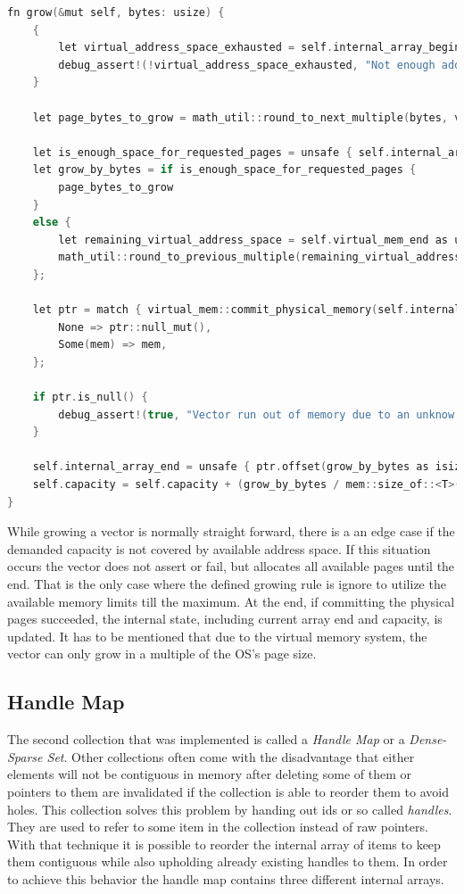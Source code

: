 \begin{lstlisting}[caption={Growth function of the Spark vector in Rust.}, label={lst:vector_growth}, language={C++}]
fn grow(&mut self, bytes: usize) {
	{
		let virtual_address_space_exhausted = self.internal_array_begin.as_ptr() as *mut u8 == self.virtual_mem_end;
		debug_assert!(!virtual_address_space_exhausted, "Not enough address space to grow further");
	}
	
	let page_bytes_to_grow = math_util::round_to_next_multiple(bytes, virtual_mem::get_page_size());
	
	let is_enough_space_for_requested_pages = unsafe { self.internal_array_end.offset(page_bytes_to_grow as isize) <= self.virtual_mem_end };
	let grow_by_bytes = if is_enough_space_for_requested_pages {
		page_bytes_to_grow
	}
	else {
		let remaining_virtual_address_space = self.virtual_mem_end as usize - self.internal_array_end as usize;
		math_util::round_to_previous_multiple(remaining_virtual_address_space, virtual_mem::get_page_size())
	};
	
	let ptr = match { virtual_mem::commit_physical_memory(self.internal_array_end, grow_by_bytes) } {
		None => ptr::null_mut(),
		Some(mem) => mem,
	};
	
	if ptr.is_null() {
		debug_assert!(true, "Vector run out of memory due to an unknow error");
	}
	
	self.internal_array_end = unsafe { ptr.offset(grow_by_bytes as isize) };
	self.capacity = self.capacity + (grow_by_bytes / mem::size_of::<T>());
}
\end{lstlisting}

\noindent
While growing a vector is normally straight forward, there is a an edge case if the demanded capacity is not covered by available address space. If this situation occurs the vector does not assert or fail, but allocates all available pages until the end. That is the only case where the defined growing rule is ignore to utilize the available memory limits till the maximum. At the end, if committing the physical pages succeeded, the internal state, including current array end and capacity, is updated. It has to be mentioned that due to the virtual memory system, the vector can only grow in a multiple of the \ac{OS}'s page size.

\subsection{Handle Map} \label{handle_map_impl}

The second collection that was implemented is called a \textit{Handle Map} or a \textit{Dense-Sparse Set}. Other collections often come with the disadvantage that either elements will not be contiguous in memory after deleting some of them or pointers to them are invalidated if the collection is able to reorder them to avoid holes. This collection solves this problem by handing out ids or so called \textit{handles}. They are used to refer to some item in the collection instead of raw pointers. With that technique it is possible to reorder the internal array of items to keep them contiguous while also upholding already existing handles to them. In order to achieve this behavior the handle map contains three different internal arrays. 


